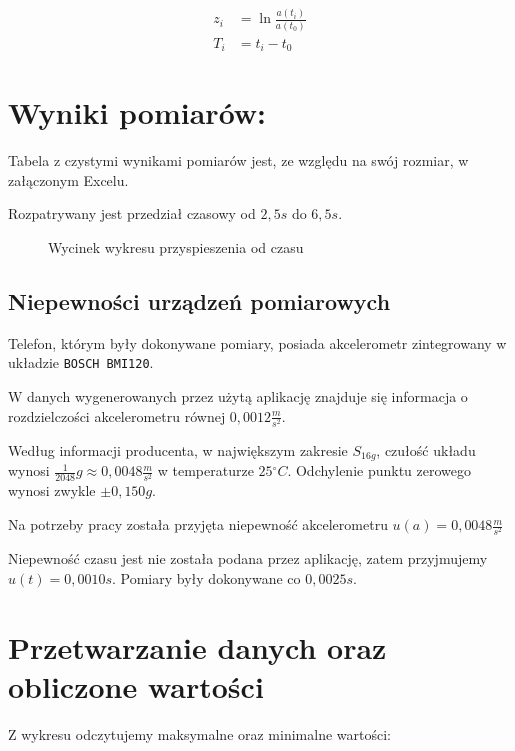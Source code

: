 \documentclass[a4paper,12pt]{article}
\newcommand{\stopnie}{\ensuremath{^{\circ}}}
\begin{document}
\begin{align}
	z_i & = \ln \frac{a\left(t_i\right)}{a\left(t_0\right)} \\
	T_i & = t_i - t_0
\end{align}\label{eq:ziti}

\section{Wyniki pomiarów:}

Tabela z czystymi wynikami pomiarów jest, ze względu na swój rozmiar, w załączonym Excelu.

Rozpatrywany jest przedział czasowy od $2,5s$ do $6,5s$.

\begin{figure}[h]
	\centering
	\caption{Wycinek wykresu przyspieszenia od czasu}
\end{figure}

\subsection{Niepewności urządzeń pomiarowych}

Telefon, którym były dokonywane pomiary, posiada akcelerometr zintegrowany w układzie \texttt{BOSCH BMI120}.

W danych wygenerowanych przez użytą aplikację znajduje się informacja o rozdzielczości akcelerometru równej $0,0012 \frac{m}{s^2}$.

Według informacji producenta, w największym zakresie $S_{16g}$, czułość układu wynosi $\frac{1}{2048}g \approx 0,0048 \frac{m}{s^2}$ w temperaturze $25\stopnie C$. Odchylenie punktu zerowego wynosi zwykle $\pm 0,150g$. 

Na potrzeby pracy została przyjęta niepewność akcelerometru $u\left(a\right) = 0,0048 \frac{m}{s^2}$

\vspace{1cm}

Niepewność czasu jest nie została podana przez aplikację, zatem przyjmujemy $u\left(t\right) = 0,0010 s$. Pomiary były dokonywane co $0,0025s$.

\clearpage

\section{Przetwarzanie danych oraz obliczone wartości}

Z wykresu odczytujemy maksymalne oraz minimalne wartości:
\end{document}
